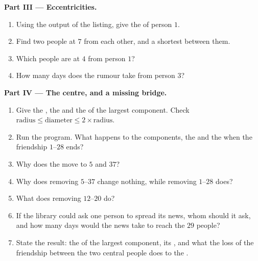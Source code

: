 \begin{problem}
\medskip\noindent\textbf{Part III --- Eccentricities.}
\begin{enumerate}[resume]
  \item Using the output of the  listing, give the  of person $1$.
  \item Find two people at  $7$ from each other, and a shortest  between them.
  \item Which people are at  $4$ from person $1$?
  \item How many days does the rumour take from person $3$?
\end{enumerate}

\medskip\noindent\textbf{Part IV --- The centre, and a missing bridge.}
\begin{enumerate}[resume]
  \item Give the , the  and the  of the largest component. Check
    $\text{radius} \le \text{diameter} \le 2 \times \text{radius}$.
  \item Run the program. What happens to the components, the  and the  when the friendship $1$--$28$
    ends?
  \item Why does the  move to $5$ and $37$?
  \item Why does removing $5$--$37$ change nothing, while removing $1$--$28$ does?
  \item What does removing $12$--$20$ do?
  \item If the library could ask one person to spread its news, whom should it ask, and how many days would the news
    take to reach the $29$ people?
  \item State the result: the  of the largest component, its , and what the loss of the friendship
    between the two central people does to the .
\end{enumerate}
\end{problem}
